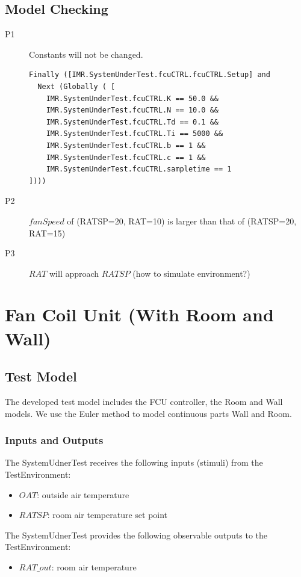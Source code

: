 \subsection{Model Checking}
\begin{description}
    \item[P1] Constants will not be changed. 
\begin{verbatim}
Finally ([IMR.SystemUnderTest.fcuCTRL.fcuCTRL.Setup] and 
  Next (Globally ( [
    IMR.SystemUnderTest.fcuCTRL.K == 50.0 && 
    IMR.SystemUnderTest.fcuCTRL.N == 10.0 && 
    IMR.SystemUnderTest.fcuCTRL.Td == 0.1 && 
    IMR.SystemUnderTest.fcuCTRL.Ti == 5000 && 
    IMR.SystemUnderTest.fcuCTRL.b == 1 && 
    IMR.SystemUnderTest.fcuCTRL.c == 1 && 
    IMR.SystemUnderTest.fcuCTRL.sampletime == 1
])))
\end{verbatim}
    \item[P2] $fanSpeed$ of (RATSP=20, RAT=10) is larger than that of (RATSP=20, RAT=15)
    \item[P3] $RAT$ will approach $RATSP$  (how to simulate environment?)
\end{description}


\section{Fan Coil Unit (With Room and Wall)}
\subsection{Test Model}
The developed test model includes the FCU controller, the Room and Wall models. We use the Euler method to model continuous parts Wall and Room. 

\subsubsection{Inputs and Outputs}
The SystemUdnerTest receives the following inputs (stimuli) from the TestEnvironment:
\begin{itemize}
    \item $OAT$: outside air temperature 
    \item $RATSP$: room air temperature set point
\end{itemize}

The SystemUdnerTest provides the following observable outputs to the TestEnvironment:
\begin{itemize}
    \item $RAT\_out$: room air temperature 
\end{itemize}

